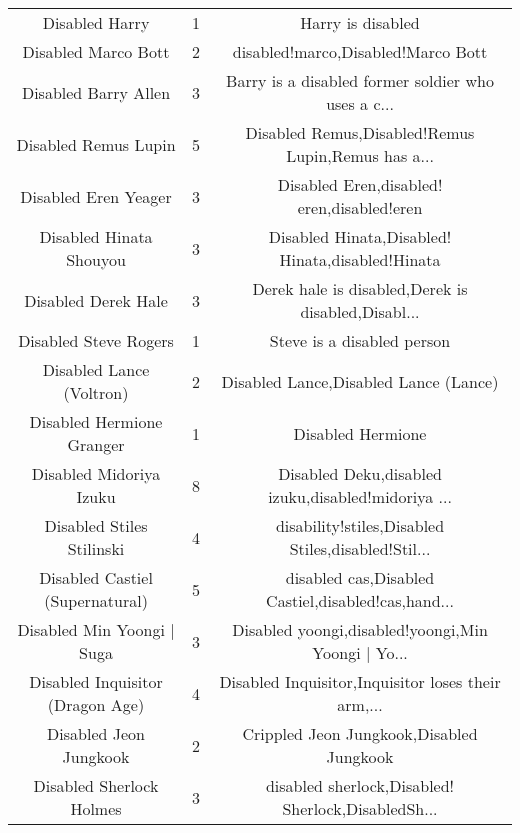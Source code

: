 \begin{table}[h!]
{\begin{tabular}{|c|c|c|}
                                    Disabled Harry &      1 &                                  Harry is disabled \\
                               Disabled Marco Bott &      2 &                 disabled!marco,Disabled!Marco Bott \\
                              Disabled Barry Allen &      3 & Barry is a disabled former soldier who uses a c... \\
                              Disabled Remus Lupin &      5 & Disabled Remus,Disabled!Remus Lupin,Remus has a... \\
                              Disabled Eren Yeager &      3 &         Disabled Eren,disabled! eren,disabled!eren \\
                           Disabled Hinata Shouyou &      3 &   Disabled Hinata,Disabled! Hinata,disabled!Hinata \\
                               Disabled Derek Hale &      3 & Derek hale is disabled,Derek is disabled,Disabl... \\
                             Disabled Steve Rogers &      1 &                         Steve is a disabled person \\
                          Disabled Lance (Voltron) &      2 &              Disabled Lance,Disabled Lance (Lance) \\
                         Disabled Hermione Granger &      1 &                                  Disabled Hermione \\
                           Disabled Midoriya Izuku &      8 & Disabled Deku,disabled izuku,disabled!midoriya ... \\
                         Disabled Stiles Stilinski &      4 & disability!stiles,Disabled Stiles,disabled!Stil... \\
                   Disabled Castiel (Supernatural) &      5 & disabled cas,Disabled Castiel,disabled!cas,hand... \\
                        Disabled Min Yoongi | Suga &      3 & Disabled yoongi,disabled!yoongi,Min Yoongi | Yo... \\
                  Disabled Inquisitor (Dragon Age) &      4 & Disabled Inquisitor,Inquisitor loses their arm,... \\
                            Disabled Jeon Jungkook &      2 &           Crippled Jeon Jungkook,Disabled Jungkook \\
                          Disabled Sherlock Holmes &      3 & disabled sherlock,Disabled! Sherlock,DisabledSh... \\

\end{tabular}}
\end{table}
